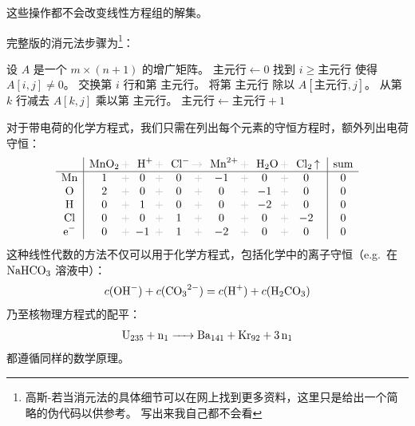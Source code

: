 \documentclass{chem-art}
\begin{document}
这些操作都不会改变线性方程组的解集。

完整版的消元法步骤为\footnote{高斯-若当消元法的具体细节可以在网上找到更多资料，这里只是给出一个简略的伪代码以供参考。
写出来我自己都不会看}：

\begin{algorithm}[H]
    \caption{高斯-若尔当消元法}
    \label{alg:gauss-jordan}
    \begin{algorithmic}[1]
        \State 设 \(A\) 是一个 \(m \times (n+1)\) 的增广矩阵。
        \State \( \text{主元行} \leftarrow 0 \)
          
        \State 找到 \(i \ge \text{主元行}\) 使得 \(A[i, j] \ne 0\)。
        \State 交换第 \(i\) 行和第 \(\text{主元行}\)。
        \State 将第 \(\text{主元行}\) 除以
        \(A[\text{主元行}, j]\)。 
         
        \State 从第 \(k\) 行减去 \(A[k, j]\) 乘以第 \(\text{主元行}\)。
        \EndIf
        \EndFor
        \State \( \text{主元行} \leftarrow \text{主元行} + 1 \)
        \EndIf
        \EndFor
    \end{algorithmic}
\end{algorithm}

对于带电荷的化学方程式，我们只需在列出每个元素的守恒方程时，额外列出电荷守恒：
\[
    \begin{array}{c|*{5}{c@{\grayplus}}c|c}
        & \multicolumn{1}{c@{\grayplus}}{\ce{MnO2}} &
        \multicolumn{1}{c@{\grayplus}}{\ce{H+}} &
        \multicolumn{1}{c@{\grayto}}{\ce{Cl-}} &
        \multicolumn{1}{c@{\grayplus}}{\ce{Mn^2+}} &
        \multicolumn{1}{c@{\grayplus}}{\ce{H2O}} &
        \multicolumn{1}{c|}{\ce{Cl2 ^}} & \text{sum} \\
        \hline
        \ce{Mn} & 1 & 0 & 0 & -1 & 0 & 0 & 0\\
        \ce{O} & 2 & 0 & 0 & 0 & -1 & 0 & 0\\
        \ce{H} & 0 & 1 & 0 & 0 & -2 & 0 & 0\\
        \ce{Cl} & 0 & 0 & 1 & 0 & 0 & -2 & 0\\
        \ce{e^-} & 0 & -1 & 1 & -2 & 0 & 0 & 0\\
    \end{array}
\]
这种线性代数的方法不仅可以用于化学方程式，包括化学中的离子守恒（e.g.\ 在\(\ce{NaHCO3}\) 溶液中）：
\[
    c(\ce{OH^-}) + c(\ce{CO3^{2-}}) = c(\ce{H^+}) + c(\ce{H2CO3})
\]
乃至核物理方程式的配平：\[
    \ce{U235 + n1 -> Ba141 + Kr92 + 3n1}
\]
都遵循同样的数学原理。
\end{document}
